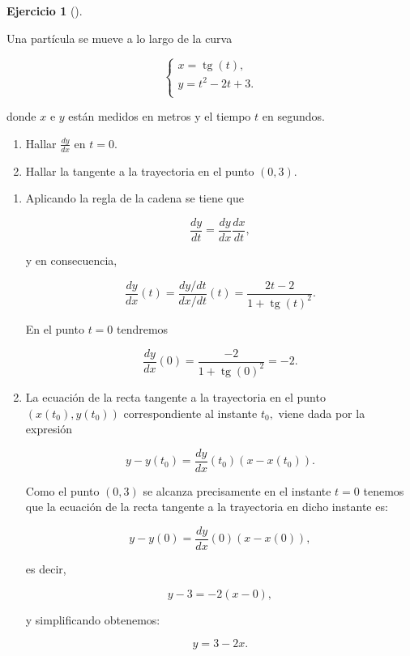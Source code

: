 \documentclass[
  spanish,
  a4paper,
]{scrreport}
\providecommand{\tightlist}{%
  \setlength{\itemsep}{0pt}\setlength{\parskip}{0pt}}
\theoremstyle{definition}
\newtheorem{exercise}{Ejercicio}[chapter]
\theoremstyle{remark}
\begin{document}
\begin{exercise}[]\protect\hypertarget{exr-trayectorias-1}{}\label{exr-trayectorias-1}

Una partícula se mueve a lo largo de la curva

\[
\begin{cases}
x = \operatorname{tg}(t),  \\
y = t^2-2t+3. \\
\end{cases}
\]

donde \(x\) e \(y\) están medidos en metros y el tiempo \(t\) en
segundos.

\begin{enumerate}
\def\labelenumi{\alph{enumi}.}
\tightlist
\item
  Hallar \(\frac{dy}{dx}\) en \(t=0\).
\item
  Hallar la tangente a la trayectoria en el punto \((0,3)\).
\end{enumerate}

\end{exercise}

\begin{tcolorbox}[enhanced jigsaw, arc=.35mm, bottomrule=.15mm, bottomtitle=1mm, breakable, colback=white, colbacktitle=quarto-callout-tip-color!10!white, colframe=quarto-callout-tip-color-frame, coltitle=black, left=2mm, leftrule=.75mm, opacityback=0, opacitybacktitle=0.6, rightrule=.15mm, title=\textcolor{quarto-callout-tip-color}{\faLightbulb}\hspace{0.5em}{Solución}, titlerule=0mm, toprule=.15mm, toptitle=1mm]

\begin{enumerate}
\def\labelenumi{\alph{enumi}.}
\item
  Aplicando la regla de la cadena se tiene que

  \[
   \dfrac{dy}{dt} = \dfrac{dy}{dx}\dfrac{dx}{dt},
   \]

  y en consecuencia,

  \[
   \dfrac{dy}{dx}(t) = \frac{dy/dt}{dx/dt}(t)=\frac{2t-2}{1+\operatorname{tg}(t)^2}.
   \]

  En el punto \(t=0\) tendremos

  \[
   \dfrac{dy}{dx}(0) = \frac{-2}{1+\operatorname{tg}(0)^2} = -2.
   \]
\item
  La ecuación de la recta tangente a la trayectoria en el punto
  \((x(t_0),y(t_0))\) correspondiente al instante \(t_0,\) viene dada
  por la expresión

  \[
   y-y(t_0) = \dfrac{dy}{dx}(t_0)(x-x(t_0)).
   \]

  Como el punto \((0,3)\) se alcanza precisamente en el instante \(t=0\)
  tenemos que la ecuación de la recta tangente a la trayectoria en dicho
  instante es:

  \[
   y-y(0) = \dfrac{dy}{dx}(0)(x-x(0)),
   \]

  es decir,

  \[
   y-3 = -2(x-0),
   \]

  y simplificando obtenemos:

  \[
   y = 3-2x.
   \]
\end{enumerate}

\end{tcolorbox}
\end{document}
